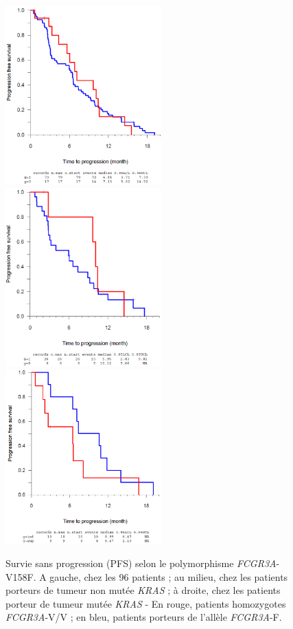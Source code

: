 \begin{figure}[htbp]
	\centering
		\includegraphics[width=6cm]{figures/raster/FIG_27a}
		\includegraphics[width=6cm]{figures/raster/FIG_27b}
		\includegraphics[width=6cm]{figures/raster/FIG_27c}
	\caption{Survie sans progression (PFS) selon le polymorphisme \textit{FCGR3A}-V158F. A gauche, chez les 96 patients ; au milieu, chez les patients porteurs de tumeur non mutée \textit{KRAS} ; à droite, chez les patients porteur de tumeur mutée \textit{KRAS} - En rouge, patients homozygotes \textit{FCGR3A}-V/V ; en bleu, patients porteurs de l'allèle \textit{FCGR3A}-F.}
	\label{fig:27}
\end{figure}
